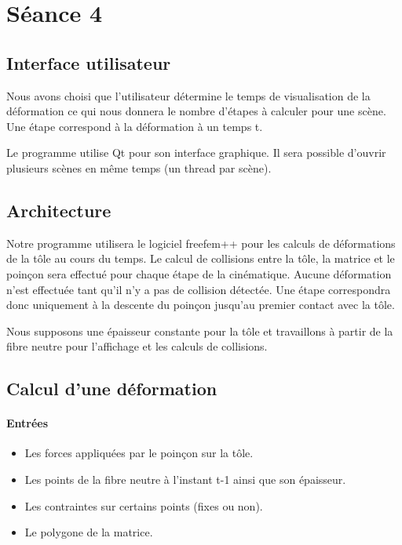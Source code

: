 \section{Séance 4}

\subsection{Interface utilisateur}
Nous avons choisi que l'utilisateur détermine le temps de visualisation de la déformation ce qui nous donnera le nombre d'étapes à calculer pour une scène.
Une étape correspond à la déformation à un temps t.

Le programme utilise Qt pour son interface graphique.
Il sera possible d'ouvrir plusieurs scènes en même temps (un thread par scène).

\subsection{Architecture}
Notre programme utilisera le logiciel freefem++ pour les calculs de déformations de la tôle au cours du temps.
Le calcul de collisions entre la tôle, la matrice et le poinçon sera effectué pour chaque étape de la cinématique.
Aucune déformation n'est effectuée tant qu'il n'y a pas de collision détectée.
Une étape correspondra donc uniquement à la descente du poinçon jusqu'au premier contact avec la tôle.

Nous supposons une épaisseur constante pour la tôle et travaillons à partir de la fibre neutre pour l'affichage et les calculs de collisions.

\subsection{Calcul d'une déformation}

\paragraph{Entrées}
\begin{itemize}
    \item Les forces appliquées par le poinçon sur la tôle.
    \item Les points de la fibre neutre à l'instant t-1 ainsi que son épaisseur.
    \item Les contraintes sur certains points (fixes ou non).
    \item Le polygone de la matrice.
\end{itemize}

